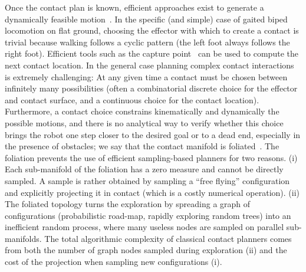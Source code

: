 \documentclass[journal]{IEEEtran}
\begin{document}
Once the contact plan is known, efficient approaches exist to generate a dynamically feasible motion~\citep{Carpentier2016}.
In the specific (and simple) case of gaited biped locomotion on flat ground, 
choosing the effector with which to create a contact is trivial because walking follows a cyclic pattern (the left foot always follows the right foot).
Efficient tools such as the capture point~\citep{Pratt2006} can be used to compute the next contact location.
In the general case planning complex contact interactions is extremely challenging:
At any given time a contact must be chosen between infinitely many possibilities (often a combinatorial discrete choice for the effector and contact surface, and a continuous choice for the contact location). Furthermore, a contact choice constrains kinematically and dynamically the possible motions, and there is no analytical way to verify whether this choice brings the robot one step closer to the desired goal or to a dead end, especially in the presence of obstacles; we say that the contact manifold is foliated~\citep{simeon-manipulation-04}. 
The
foliation prevents the use of efficient sampling-based
planners
for two reasons. (i) Each sub-manifold of the         
foliation
has
a zero measure and cannot be directly sampled.         
A
sample
is
rather obtained by sampling a “free flying”         
configuration
and
explicitly projecting it in contact (which is a         
costly
numerical
operation).
(ii) The foliated topology       
turns
the
exploration
by
spreading
a graph of configurations        
(probabilistic
road-map,
rapidly
exploring
random trees) into      
an
inefficient
random
process,
where
many
useless nodes       
are
sampled
on
parallel
sub-manifolds.
The
total
algorithmic       
complexity
of
classical
contact
planners
comes
from
both the        
number
of
graph
nodes
sampled
during
exploration
(ii) and
the cost of the projection when sampling new configurations
(i).
\end{document}
